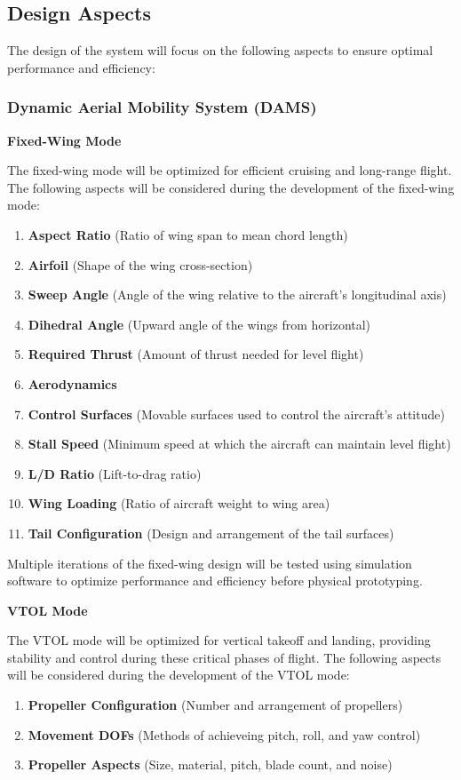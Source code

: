 \documentclass[12pt]{article}
\begin{document}
\subsection{Design Aspects}
The design of the system will focus on the following aspects to ensure optimal performance and efficiency:
\subsubsection{Dynamic Aerial Mobility System (DAMS)}
\textbf{Fixed-Wing Mode}

The fixed-wing mode will be optimized for efficient cruising and long-range flight.
The following aspects will be considered during the development of the fixed-wing mode:
\begin{enumerate}
    \item \textbf{Aspect Ratio} (Ratio of wing span to mean chord length)
    \item \textbf{Airfoil} (Shape of the wing cross-section)
    \item \textbf{Sweep Angle} (Angle of the wing relative to the aircraft's longitudinal axis)
    \item \textbf{Dihedral Angle} (Upward angle of the wings from horizontal)
    \item \textbf{Required Thrust} (Amount of thrust needed for level flight)
    \item \textbf{Aerodynamics}
    \item \textbf{Control Surfaces} (Movable surfaces used to control the aircraft's attitude)
    \item \textbf{Stall Speed} (Minimum speed at which the aircraft can maintain level flight)
    \item \textbf{L/D Ratio} (Lift-to-drag ratio)
    \item \textbf{Wing Loading} (Ratio of aircraft weight to wing area)
    \item \textbf{Tail Configuration} (Design and arrangement of the tail surfaces)
\end{enumerate}

Multiple iterations of the fixed-wing design will be tested using simulation software to optimize performance and efficiency before physical prototyping.

\textbf{VTOL Mode}

The VTOL mode will be optimized for vertical takeoff and landing, providing stability and control during these critical phases of flight.
The following aspects will be considered during the development of the VTOL mode:
\begin{enumerate}
    \item \textbf{Propeller Configuration} (Number and arrangement of propellers)
    \item \textbf{Movement DOFs} (Methods of achieveing pitch, roll, and yaw control)
    \item \textbf{Propeller Aspects} (Size, material, pitch, blade count, and noise)
\end{enumerate}
\end{document}
